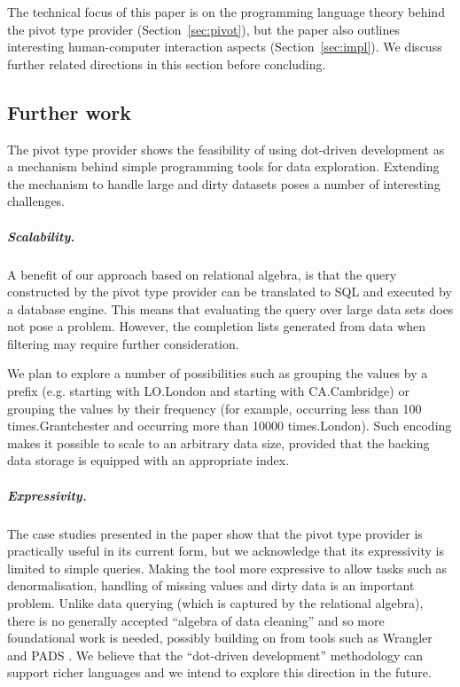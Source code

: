 \documentclass[a4paper,UKenglish]{lipics-v2016}
\theoremstyle{plain}
\theoremstyle{definition}
\newcommand{\ident}[1]{\textnormal{\sffamily #1}}
\newcommand{\qident}[1]{\textnormal{\sffamily \guillemotleft #1\guillemotright}}
\begin{document}
The technical focus of this paper is on the programming language theory behind the pivot type
provider (Section~\ref{sec:pivot}), but the paper also outlines interesting human-computer interaction 
aspects (Section~\ref{sec:impl}). We discuss further related directions in this
section before concluding.

\subsection{Further  work}
\label{sec:further}

The pivot type provider shows the feasibility of using dot-driven development as a mechanism behind 
simple programming tools for data exploration. Extending the mechanism to handle large and dirty 
datasets poses a number of interesting challenges.

\vspace{-0.25em}
\subparagraph{Scalability.} A benefit of our approach based on relational algebra, is that the 
query constructed by the pivot type provider can be translated to SQL and executed by a database 
engine. This means that evaluating the query over large data sets does not pose a problem. However,
the completion lists generated from data when filtering may require further consideration.

We plan to explore a number of possibilities such as grouping the values by a prefix (e.g.
\qident{starting with LO}.\ident{London} and \qident{starting with CA}.\ident{Cambridge})
or grouping the values by their frequency (for example, \qident{occurring less than 100 
times}.\ident{Grantchester} and \qident{occurring more than 10000 times}.\ident{London}). 
Such encoding makes it possible to scale to an arbitrary data size, provided that the backing 
data storage is equipped with an appropriate index.

\vspace{-0.25em}
\subparagraph{Expressivity.} 
The case studies presented in the paper show that the pivot type provider is practically useful in 
its current form, but we acknowledge that its expressivity is limited to simple queries.
Making the tool more expressive to allow tasks such as denormalisation, handling of missing values 
and dirty data is an important problem. 
Unlike data querying (which is captured by the relational algebra), there is no generally accepted 
``algebra of data cleaning'' and so more foundational work is needed, possibly building on 
from tools such as Wrangler \cite{wrangler} and PADS \cite{pads}. We believe that the 
``dot-driven development'' methodology can support richer languages and we intend to explore this
direction in the future.
\end{document}
